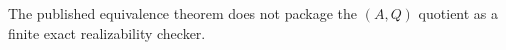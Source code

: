 The published equivalence theorem does not package the \((A,Q)\) quotient as a finite exact realizability checker.